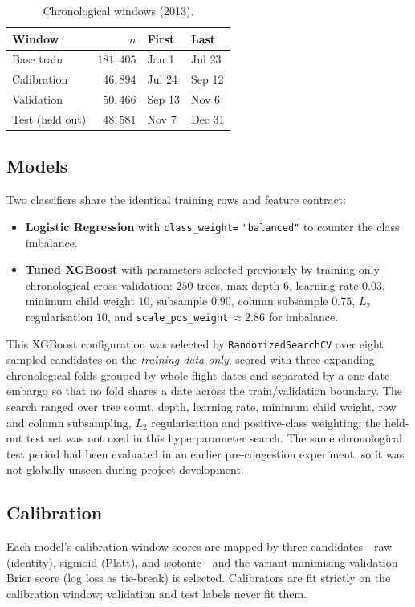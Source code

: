 \documentclass[conference]{IEEEtran}
\newcommand{\code}[1]{\texttt{#1}}
\begin{document}
\begin{table}[!t]
  \caption{Chronological windows (2013).}
  \label{tab:windows}
  \centering
  \begin{tabular}{lrll}
    \toprule
    Window & $n$ & First & Last \\
    \midrule
    Base train        & $181{,}405$ & Jan 1  & Jul 23 \\
    Calibration        & $46{,}894$  & Jul 24 & Sep 12 \\
    Validation         & $50{,}466$  & Sep 13 & Nov 6  \\
    Test (held out)    & $48{,}581$  & Nov 7  & Dec 31 \\
    \bottomrule
  \end{tabular}
\end{table}

\subsection{Models}
Two classifiers share the identical training rows and feature contract:
\begin{itemize}
  \item \textbf{Logistic Regression} with \code{class\_weight=} \code{"balanced"} to counter the class imbalance.
  \item \textbf{Tuned XGBoost} with parameters selected previously by
  training-only chronological cross-validation: $250$ trees, max depth $6$,
  learning rate $0.03$, minimum child weight $10$, subsample $0.90$, column
  subsample $0.75$, $L_2$ regularisation $10$, and
  \code{scale\_pos\_weight}$\,\approx 2.86$ for imbalance.
\end{itemize}
This XGBoost configuration was selected by \code{RandomizedSearchCV} over eight
sampled candidates on the \emph{training data only}, scored with three expanding
chronological folds grouped by whole flight dates and separated by a one-date
embargo so that no fold shares a date across the train/validation boundary. The
search ranged over tree count, depth, learning rate, minimum child weight, row
and column subsampling, $L_2$ regularisation and positive-class weighting; the
held-out test set was not used in this hyperparameter search. The same
chronological test period had been evaluated in an earlier pre-congestion
experiment, so it was not globally unseen during project development.

\subsection{Calibration}
Each model's calibration-window scores are mapped by three candidates---raw
(identity), sigmoid (Platt), and isotonic---and the
variant minimising validation Brier score (log loss as tie-break) is selected.
Calibrators are fit strictly on the calibration window; validation and test
labels never fit them.
\end{document}
